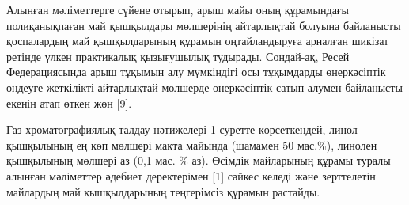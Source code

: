 \begin{table}[H]
\caption*{2-кесте - Базалық майлардағы полиқанықпаған май қышқылдары мөлшері}
\centering
{}
\end{table}

\begin{multicols}{2}
Алынған мәліметтерге сүйене отырып, арыш майы оның құрамындағы
полиқанықпаған май қышқылдары мөлшерінің айтарлықтай болуына байланысты
қоспалардың май қышқылдарының құрамын оңтайландыруға арналған шикізат
ретінде үлкен практикалық қызығушылық тудырады. Сондай-ақ, Ресей
Федерациясында арыш тұқымын алу мүмкіндігі осы тұқымдарды өнеркәсіптік
өңдеуге жеткілікті айтарлықтай мөлшерде өнеркәсіптік сатып алумен
байланысты екенін атап өткен жөн {[}9{]}.

Газ хроматографиялық талдау нәтижелері 1-суретте көрсеткендей, линол
қышқылының ең көп мөлшері мақта майында (шамамен 50 мас.\%), линолен
қышқылының мөлшері аз (0,1 мас. \% аз). Өсімдік майларының құрамы туралы
алынған мәліметтер әдебиет деректерімен {[}1{]} сәйкес келеді және
зерттелетін майлардың май қышқылдарының теңгерімсіз құрамын растайды.
\end{multicols}

